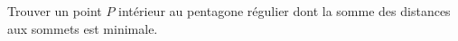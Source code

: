 Trouver un point $P$ intérieur au pentagone régulier dont la somme des distances aux sommets est minimale.
